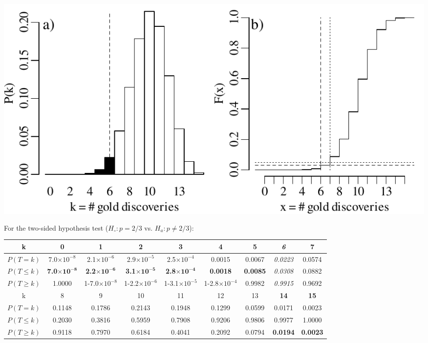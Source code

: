 \noindent\begin{minipage}[t][][b]{.6\textwidth}
\includegraphics[width=\textwidth]{../figures/1sidedbinomialrejection15.pdf}
\medskip
\end{minipage}
\begin{minipage}[t][][t]{.4\textwidth}
  \label{fig:1sidedbinomialrejection15}
\end{minipage}

For the two-sided hypothesis test ($H_\circ: p={2/3}$ vs. $H_a:
p\neq{2/3}$):

\begin{center}
\begin{tabular}{c@{\gap}c@{\gap}c@{\gap}c@{\gap}c@{\gap}c@{\gap}c@{\gap}c@{\gap}c}
    k & \textbf{0} & \textbf{1} & \textbf{2} & \textbf{3} & \textbf{4}
    & \textbf{5} & \textit{6} & 7 \\ \hline $P(T=k)$ &
    7.0$\times{10}^{-8}$ & 2.1$\times{10}^{-6}$ & 2.9$\times{10}^{-5}$
    & 2.5$\times{10}^{-4}$ & 0.0015 & 0.0067 & \textit{0.0223} & 0.0574 \\
    $P({T}\leq{k})$ & \textbf{7.0}$\mathbf{\times{10}^{-8}}$ &
    \textbf{2.2}$\mathbf{\times{10}^{-6}}$ &
    \textbf{3.1}$\mathbf{\times{10}^{-5}}$ &
    \textbf{2.8}$\mathbf{\times{10}^{-4}}$ & \textbf{0.0018} &
    \textbf{0.0085} & \textit{0.0308} & 0.0882 \\
    $P({T}\geq{k})$ & 1.0000 &
    1-7.0$\times{10}^{-8}$ & 1-2.2$\times{10}^{-6}$ &
    1-3.1$\times{10}^{-5}$ & 1-2.8$\times{10}^{-4}$ & 0.9982 & \textit{0.9915}
    & 0.9692 \\ k & 8 & 9 & 10 & 11 & 12 & 13 & \textbf{14} & \textbf{15} \\ \hline
    $P(T=k)$ & 0.1148 & 0.1786 & 0.2143 & 0.1948
    & 0.1299 & 0.0599 & 0.0171 & 0.0023 \\
    $P({T}\leq{k})$ & 0.2030 &
    0.3816 & 0.5959 & 0.7908 & 0.9206 & 0.9806 & 0.9977 & 1.0000 \\
    $P({T}\geq{k})$ & 0.9118 & 0.7970 & 0.6184 & 0.4041 & 0.2092 &
    0.0794 & \textbf{0.0194} & \textbf{0.0023}
\end{tabular}
\end{center}

